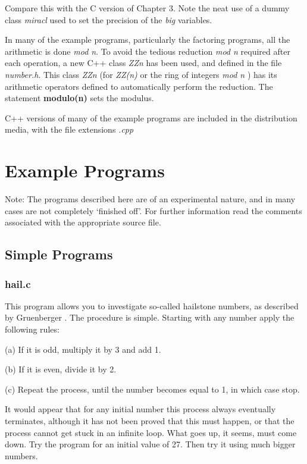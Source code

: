 Compare this with the C version of Chapter 3. Note the neat use of a dummy 
class {\em miracl} used to set the precision of the {\em big} variables.

In many of the example programs, particularly the factoring programs, all the 
arithmetic is done {\em mod n}. To avoid the tedious reduction {\em mod n} 
required after each operation, a new C++ class {\em ZZn} has been used, and 
defined in the file {\em number.h}. This class {\em ZZn} (for 
{\em ZZ(n)} or the ring of integers {\em mod n} ) 
has its arithmetic operators defined to automatically perform the reduction. 
The statement {\bf modulo(n)} sets the modulus.

C++ versions of many of the example programs are included in the distribution 
media, with the file extensions {\em .cpp}

\cleardoublepage
\chapter{Example Programs}

      Note:  The programs described here are of an experimental nature, and 
      in  many  cases  are  not  completely  `finished  off'.  For  further 
      information read the comments associated with the appropriate  source 
      file.  

      \section{Simple Programs}

      \subsection{hail.c}

      This  program  allows you to investigate so-called hailstone numbers, 
      as  described  by Gruenberger \cite{Fred}. 
      The procedure is simple.  Starting 
      with any number apply the following rules: 

      (a) If it is odd, multiply it by 3 and add 1.

      (b) If it is even, divide it by 2.

      (c) Repeat the process,  until the number becomes equal to 1, in which
          case stop.  

      It would appear that for  any  initial  number  this  process  always 
      eventually terminates, although it has not been proved that this must 
      happen,  or  that  the process cannot get stuck in an infinite loop.  
      What goes up,  it seems,  must come down.  Try  the  program  for  an 
      initial value of 27. Then try it using much bigger numbers.  

